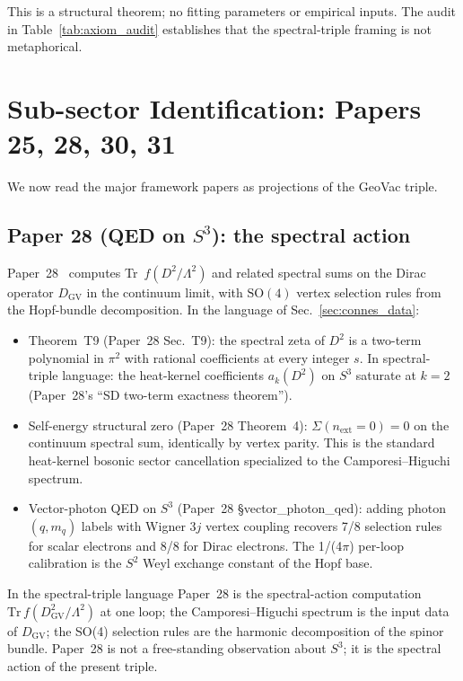\documentclass[11pt]{article}
\begin{document}
This is a structural theorem; no fitting parameters or empirical
inputs.  The audit in Table~\ref{tab:axiom_audit} establishes that the
spectral-triple framing is not metaphorical.

\section{Sub-sector Identification: Papers 25, 28, 30, 31}
\label{sec:subsectors}

We now read the major framework papers as projections of the GeoVac
triple.

\subsection{Paper 28 (QED on $S^3$): the spectral action}

Paper~28~\cite{paper28} computes Tr~$f(D^2/\Lambda^2)$ and related
spectral sums on the Dirac operator $D_{\mathrm{GV}}$ in the continuum
limit, with $\mathrm{SO}(4)$ vertex selection rules from the
Hopf-bundle decomposition.  In the language of Sec.~\ref{sec:connes_data}:
\begin{itemize}\setlength{\itemsep}{0pt}
\item Theorem~T9 (Paper~28 Sec.~T9): the spectral zeta of $D^2$ is a
two-term polynomial in $\pi^2$ with rational coefficients at every
integer $s$.  In spectral-triple language: the heat-kernel
coefficients $a_k(D^2)$ on $S^3$ saturate at $k=2$ (Paper~28's
``SD two-term exactness theorem'').
\item Self-energy structural zero (Paper~28 Theorem~4):
$\Sigma(n_{\mathrm{ext}}=0) = 0$ on the continuum spectral sum,
identically by vertex parity.  This is the standard heat-kernel
bosonic sector cancellation specialized to the Camporesi--Higuchi
spectrum.
\item Vector-photon QED on $S^3$ (Paper~28 \S vector\_photon\_qed):
adding photon $(q, m_q)$ labels with Wigner 3$j$ vertex coupling
recovers 7/8 selection rules for scalar electrons and 8/8 for Dirac
electrons.  The 1/(4$\pi$) per-loop calibration is the $S^2$ Weyl
exchange constant of the Hopf base.
\end{itemize}

In the spectral-triple language Paper~28 is the spectral-action
computation $\mathrm{Tr}\,f(D_{\mathrm{GV}}^2/\Lambda^2)$ at one loop;
the Camporesi--Higuchi spectrum is the input data of $D_{\mathrm{GV}}$;
the SO(4) selection rules are the harmonic decomposition of the spinor
bundle.  Paper~28 is not a free-standing observation about $S^3$; it is
the spectral action of the present triple.
\end{document}
